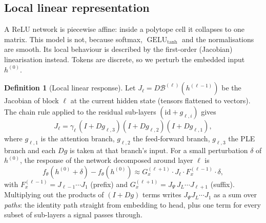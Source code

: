 \documentclass[10pt,a4paper]{article}
\newcommand{\op}[1]{\operatorname{#1}}
\theoremstyle{definition}
\newtheorem{definition}{Definition}[section]
\begin{document}
\subsection{Local linear representation}
A ReLU network is piecewise affine: inside a polytope cell it collapses to one matrix. This model is not, because softmax, $\op{GELU}_{\tanh}$ and the normalisations are smooth. Its local behaviour is described by the first-order (Jacobian) linearisation instead. Tokens are discrete, so we perturb the embedded input $h^{(0)}$.
\begin{definition}[Local linear response]
Let $J_\ell=D\mathcal{B}^{(\ell)}(h^{(\ell-1)})$ be the Jacobian of block $\ell$ at the current hidden state (tensors flattened to vectors). The chain rule applied to the residual sub-layers $(\mathrm{id}+g_{\ell,i})$ gives
\begin{equation}
  J_\ell = \gamma_\ell\,(I+Dg_{\ell,3})(I+Dg_{\ell,2})(I+Dg_{\ell,1}),
\end{equation}
where $g_{\ell,1}$ is the attention branch, $g_{\ell,2}$ the feed-forward branch, $g_{\ell,3}$ the PLE branch and each $Dg$ is taken at that branch's input. For a small perturbation $\delta$ of $h^{(0)}$, the response of the network decomposed around layer $\ell$ is
\begin{equation}
  f_\theta(h^{(0)}+\delta)-f_\theta(h^{(0)}) \approx G^{(\ell+1)}_x\cdot J_\ell\cdot F^{(\ell-1)}_x\cdot\delta,
\end{equation}
with $F^{(\ell-1)}_x=J_{\ell-1}\cdots J_1$ (prefix) and $G^{(\ell+1)}_x=J_\Psi\,J_L\cdots J_{\ell+1}$ (suffix). Multiplying out the products of $(I+Dg)$ terms writes $J_\Psi J_L\cdots J_1$ as a sum over \emph{paths}: the identity path straight from embedding to head, plus one term for every subset of sub-layers a signal passes through.
\end{definition}
\end{document}
